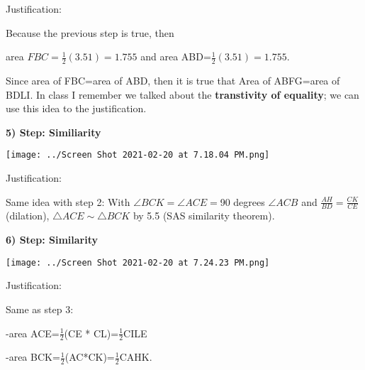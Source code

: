 \documentclass{article}
\begin{document}
Justification: 

\vspace{2mm}

Because the previous step is true, then

\vspace{2mm}

area $FBC=\frac{1}{2}(3.51)=1.755$ and area ABD=$\frac{1}{2}(3.51)=1.755$.

\vspace{2mm}

Since area of FBC=area of ABD, then it is true that Area of ABFG=area of BDLI. In class I remember we talked about the \textbf{transtivity of equality}; we can use this idea to the justification. 

\vspace{4mm}

\textbf{5) Step: Similiarity}

\texttt{[image: ../Screen Shot 2021-02-20 at 7.18.04 PM.png]}

\vspace{2mm}

Justification: 

\vspace{2mm}

Same idea with step 2: With $\angle BCK=\angle ACE=$90 degrees $\angle ACB$ and  $\frac{AH}{BD}=\frac{CK}{CE}$ (dilation), $\triangle ACE \sim \triangle BCK$ by 5.5 (SAS similarity theorem).

\vspace{2mm}

\newpage
\textbf{6) Step: Similarity}

\vspace{2mm}

\texttt{[image: ../Screen Shot 2021-02-20 at 7.24.23 PM.png]}

\vspace{2mm}

Justification: 

\vspace{2mm}

Same as step 3: 

\vspace{2mm}

-area ACE=$\frac{1}{2}$(CE * CL)=$\frac{1}{2}$CILE

\vspace{2mm}

-area BCK=$\frac{1}{2}$(AC*CK)=$\frac{1}{2}$CAHK.
\end{document}
